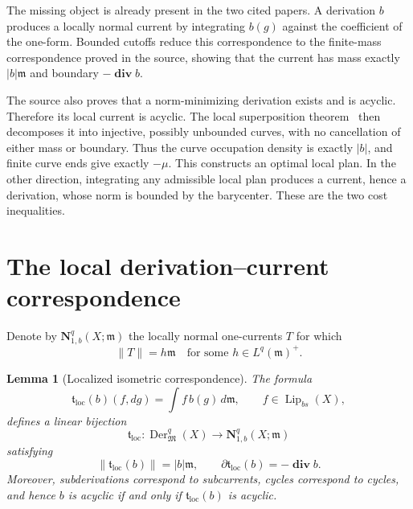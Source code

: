 \documentclass[11pt]{article}
\newtheorem{lemma}[theorem]{Lemma}
\newcommand{\X}{X}
\newcommand{\m}{\mathfrak m}
\newcommand{\Lip}{\operatorname{Lip}}
\newcommand{\Der}{\operatorname{Der}}
\newcommand{\diver}{\boldsymbol{\operatorname{div}}}
\begin{document}
The missing object is already present in the two cited papers.  A derivation
$b$ produces a locally normal current by integrating $b(g)$ against the
coefficient of the one-form.  Bounded cutoffs reduce this correspondence to
the finite-mass correspondence proved in the source, showing that the current
has mass exactly $|b|\m$ and boundary $-\diver b$.

The source also proves that a norm-minimizing derivation exists and is
acyclic.  Therefore its local current is acyclic.  The local superposition
theorem~\cite{ARV} then decomposes it into injective, possibly unbounded
curves, with no cancellation of either mass or boundary.  Thus the curve
occupation density is exactly $|b|$, and finite curve ends give exactly
$-\mu$.  This constructs an optimal local plan.  In the other direction,
integrating any admissible local plan produces a current, hence a derivation,
whose norm is bounded by the barycenter.  These are the two cost inequalities.

\section{The local derivation--current correspondence}

Denote by $\mathbf N^q_{1,b}(\X;\m)$ the locally normal one-currents $T$ for
which
\[
 \|T\|=h\m\quad\text{for some }h\in L^q(\m)^+.
\]

\begin{lemma}[Localized isometric correspondence]\label{lem:local-t}
The formula
\[
 \mathfrak t_{\mathrm{loc}}(b)(f,dg)=\int f\,b(g)\,d\m,
 \qquad f\in\Lip_{bs}(\X),
 \tag{4.1}\label{eq:tloc}
\]
defines a linear bijection
\[
 \mathfrak t_{\mathrm{loc}}:\Der^q_{\mathfrak M}(\X)
 \longrightarrow \mathbf N^q_{1,b}(\X;\m)
\]
satisfying
\[
 \|\mathfrak t_{\mathrm{loc}}(b)\|=|b|\m,
 \qquad
 \partial\mathfrak t_{\mathrm{loc}}(b)=-\diver b.
 \tag{4.2}\label{eq:isometry}
\]
Moreover, subderivations correspond to subcurrents, cycles correspond to
cycles, and hence $b$ is acyclic if and only if
$\mathfrak t_{\mathrm{loc}}(b)$ is acyclic.
\end{lemma}
\end{document}
